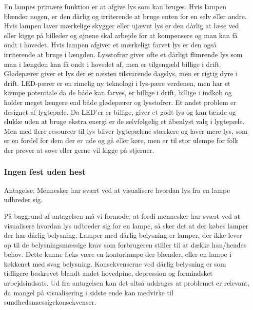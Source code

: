 En lampes primære funktion er at afgive lys som kan bruges. Hvis lampen blænder nogen, er den dårlig og irriterende at bruge enten for en selv eller andre. Hvis lampen laver mærkelige skygger eller ujævnt lys er den dårlig at læse ved eller kigge på billeder og øjnene skal arbejde for at kompensere og man kan få ondt i hovedet. Hvis lampen afgiver et mærkeligt farvet lys er den også irriterende at bruge i længden. Lysstofrør giver ofte et dårligt flimrende lys som man i længden kan få ondt i hovedet af, men er tilgengæld billige i drift. Glødepærer giver et lys der er næsten tilsvarende dagslys, men er rigtig dyre i drift\cite{videnskab_dk_led}. LED-pærer er en rimelig ny teknologi i lys-pære verdenen, men har et kæmpe potentiale da de både kan farves, er billige i drift, billige i indkøb og holder meget længere end både glødepærer og lysstofrør. Et andet problem er designet af lygtepæle. Da LED'er er billige, giver et godt lys og kan tænde og slukke uden at bruge ekstra energi er de selvfølgelig et åbenlyst valg i lygtepæle. Men med flere resourcer til lys bliver lygtepælene stærkere og laver mere lys, som er en fordel for dem der er ude og gå eller køre, men er til stor ulempe for folk der prøver at sove eller gerne vil kigge på stjerner\cite{dr_dk_lysforurening}.


\subsubsection{Ingen fest uden hest}

Antagelse: Mennesker har svært ved at visualisere hvordan lys fra en lampe udbreder sig.

På baggrund af antagelsen må vi formode, at fordi mennesker har svært ved at visualisere hvordan lys udbreder sig for en lampe, så sker det at der købes lamper der har dårlig belysning. Lamper med dårlig belysning er lamper, der ikke lever op til de belysningsmæssige krav som forbrugeren stiller til at dække han/hendes behov. Dette kunne f.eks være en kontorlampe der blænder, eller en lampe i køkkenet med svag belysning. Konsekvenserne ved dårlig belysning er som tidligere beskrevet blandt andet hovedpine, depression og formindsket arbejdsindsats. Ud fra antagelsen kan det altså uddrages at problemet er relevant, da mangel på visualisering i sidste ende kan medvirke til sundhedsmæssigekonsekvenser.